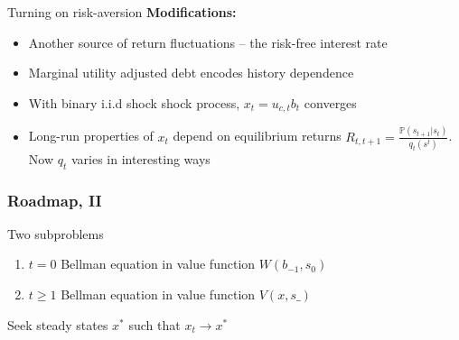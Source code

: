 \documentclass{beamer}
\begin{document}
 \begin{frame}{Turning on risk-aversion}
  \textbf{Modifications:}
  \begin{itemize}
  \item Another source of return fluctuations -- the risk-free interest rate
   \item Marginal utility adjusted debt  encodes history dependence
   \item  With binary i.i.d shock shock process,  $x_t=u_{c,t}b_{t}$  converges

   \item Long-run properties of $x_t$ depend on equilibrium returns $R_{t,t+1}=\frac{\mathbb{P}(s_{t+1}|s_t)}{q_t(s^t)}$.
   Now $q_t$ varies in interesting ways


  \end{itemize}
  \end{frame}
%


\begin{frame}
\frametitle{Roadmap, II}


 Two subproblems
\begin{enumerate}
 \item  $t=0$ Bellman equation in value function $W(b_{-1},s_0)$ %
 \item  $t\geq 1$ Bellman equation in value function $V(x,s\_)$
\end{enumerate}

Seek steady states $x^*$ such that $x_t \to x^*$

\end{frame}
\end{document}
